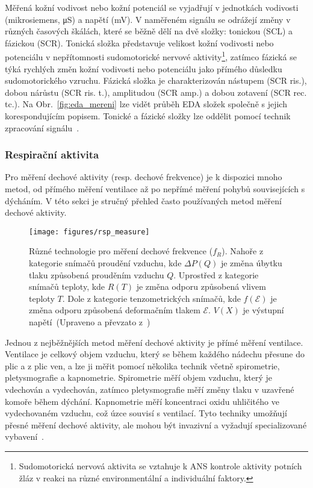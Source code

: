 Měřená kožní vodivost nebo kožní potenciál se vyjadřují v jednotkách vodivosti
(mikrosiemens, \si{\micro\siemens}) a napětí (\si{\milli\volt}). V naměřeném
signálu se odrážejí změny v různých časových škálách, které se běžně dělí na dvě
složky: tonickou (\gls{SCL}) a fázickou (\gls{SCR}). Tonická složka představuje
velikost kožní vodivosti nebo potenciálu v nepřítomnosti sudomotorické nervové
aktivity\footnote{Sudomotorická nervová aktivita se vztahuje k \gls{ANS}
kontrole aktivity potních žláz v reakci na různé environmentální a individuální
faktory.}, zatímco fázická se týká rychlých změn kožní vodivosti nebo potenciálu
jako přímého důsledku sudomotorického vzruchu. Fázická složka je charakterizován
nástupem (SCR ris.), dobou nárůstu (SCR ris. t.), amplitudou (SCR amp.) a dobou
zotavení (SCR rec. tc.). Na Obr.~\ref{fig:eda_mereni} lze vidět průběh EDA
složek společně s jejich korespondujícím popisem. Tonické a fázické složky lze
oddělit pomocí technik zpracování
signálu~\cite{Boucsein2012,Li2022,Posada2020,Caruelle2019,Caruelle2019}.

\subsubsection{Respirační aktivita}
\label{subsec:respiracni_aktivita}
Pro měření dechové aktivity (resp. dechové frekvence) je k dispozici mnoho
metod, od přímého měření ventilace až po nepřímé měření pohybů souvisejících s
dýcháním. V této sekci je stručný přehled často používaných metod měření dechové
aktivity.

\begin{figure}[htb!]
    \begin{center}
        \texttt{[image: figures/rsp\_measure]}
        \caption{Různé technologie pro měření dechové frekvence ($f_R$). Nahoře
        z kategorie snímačů proudění vzduchu, kde $ΔP(Q)$ je změna úbytku tlaku
        způsobená prouděním vzduchu $Q$. Uprostřed z kategorie snímačů teploty,
        kde $R(T)$ je změna odporu způsobená vlivem teploty $T$. Dole z
        kategorie tenzometrických snímačů, kde $f(\mathcal{E})$ je změna odporu
        způsobená deformačním tlakem $\mathcal{E}$. $V(X)$ je výstupní
        napětí~(Upraveno a převzato z~\cite{Massaroni2019})}
        \label{fig:rsp_mereni}
    \end{center}
\end{figure}

Jednou z nejběžnějších metod měření dechové aktivity je přímé měření ventilace.
Ventilace je celkový objem vzduchu, který se během každého nádechu přesune do
plic a z plic ven, a lze ji měřit pomocí několika technik včetně spirometrie,
pletysmografie a kapnometrie. Spirometrie měří objem vzduchu, který je vdechován
a vydechován, zatímco pletysmografie měří změny tlaku v uzavřené komoře během
dýchání. Kapnometrie měří koncentraci oxidu uhličitého ve vydechovaném vzduchu,
což úzce souvisí s ventilací. Tyto techniky umožňují přesné měření dechové
aktivity, ale mohou být invazivní a vyžadují specializované
vybavení~\cite{Massaroni2019,Massaroni2021,Liu2019}. 

